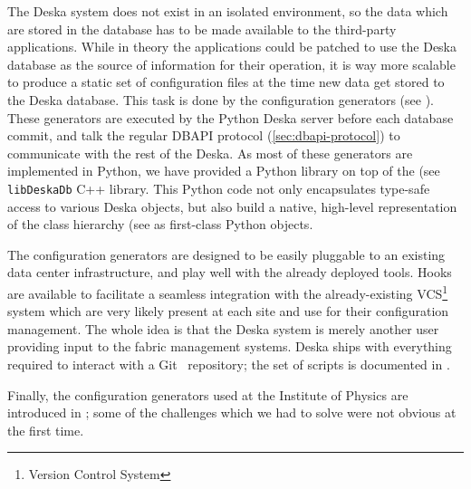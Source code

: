 \documentclass[deska]{subfiles}
\begin{document}
The Deska system does not exist in an isolated environment, so the data which are stored in the database has to be made
available to the third-party applications.  While in theory the applications could be patched to use the Deska database
as the source of information for their operation, it is way more scalable to produce a static set of configuration files
at the time new data get stored to the Deska database.  This task is done by the configuration generators (see
).  These generators are executed by the Python Deska server before each database commit,
and talk the regular DBAPI protocol (\ref{sec:dbapi-protocol}) to communicate with the rest of the Deska.  As most of
these generators are implemented in Python, we have provided a Python library on top of the (see
 {\tt libDeskaDb} C++ library.  This Python code not only encapsulates type-safe access to
various Deska objects, but also build a native, high-level representation of the class hierarchy (see
 as first-class Python objects.

The configuration generators are designed to be easily pluggable to an existing data center infrastructure, and play
well with the already deployed tools.  Hooks are available to facilitate a seamless integration with the
already-existing VCS\footnote{Version Control System} system which are very likely present at each site and use for
their configuration management.  The whole idea is that the Deska system is merely another user providing input to the
fabric management systems.  Deska ships with everything required to interact with a Git~\cite{git} repository; the set
of scripts is documented in .

Finally, the configuration generators used at the Institute of Physics are introduced in ; some
of the challenges which we had to solve were not obvious at the first time.
\end{document}
